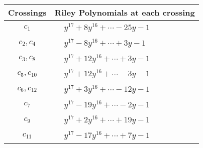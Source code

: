 \documentclass[1p]{elsarticle_modified}
\theoremstyle{definition}
\begin{document}
\begin{tabular}{m{50pt}|m{274pt}}
Crossings & \hspace{64pt}Riley Polynomials at each crossing \\
\hline $$\begin{aligned}c_{1}\end{aligned}$$&$\begin{aligned}
&y^{17}+8 y^{16}+\cdots-25 y-1
\end{aligned}$\\
\hline $$\begin{aligned}c_{2},c_{4}\end{aligned}$$&$\begin{aligned}
&y^{17}-8 y^{16}+\cdots+3 y-1
\end{aligned}$\\
\hline $$\begin{aligned}c_{3},c_{8}\end{aligned}$$&$\begin{aligned}
&y^{17}+12 y^{16}+\cdots+3 y-1
\end{aligned}$\\
\hline $$\begin{aligned}c_{5},c_{10}\end{aligned}$$&$\begin{aligned}
&y^{17}+12 y^{16}+\cdots-3 y-1
\end{aligned}$\\
\hline $$\begin{aligned}c_{6},c_{12}\end{aligned}$$&$\begin{aligned}
&y^{17}+3 y^{16}+\cdots-12 y-1
\end{aligned}$\\
\hline $$\begin{aligned}c_{7}\end{aligned}$$&$\begin{aligned}
&y^{17}-19 y^{16}+\cdots-2 y-1
\end{aligned}$\\
\hline $$\begin{aligned}c_{9}\end{aligned}$$&$\begin{aligned}
&y^{17}+2 y^{16}+\cdots+19 y-1
\end{aligned}$\\
\hline $$\begin{aligned}c_{11}\end{aligned}$$&$\begin{aligned}
&y^{17}-17 y^{16}+\cdots+7 y-1
\end{aligned}$\\
\hline
\end{tabular}\\~\\
\end{document}
